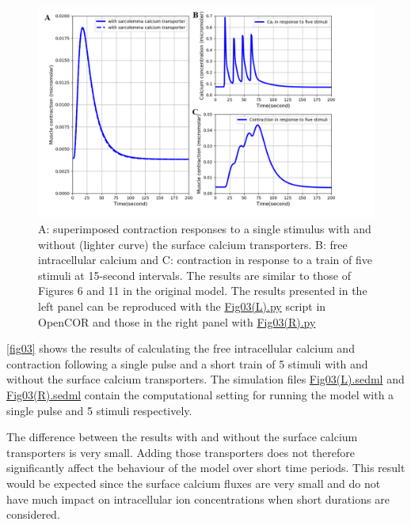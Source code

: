 \documentclass[fleqn,10pt]{physiome}
\begin{document}
\begin{figure}[ht]
\centering
\includegraphics[width=1\linewidth]{fig03.png}
\caption{A: superimposed contraction responses to a single stimulus with and without (lighter curve) the surface calcium transporters. B: free intracellular calcium and C: contraction in response to a train of five stimuli at 15-second intervals. The results are similar to those of Figures 6 and 11 in the original \citet{shorten2007mathematical} model. The results presented in the left panel can be reproduced with the \href{https://models.physiomeproject.org/workspace/5c6/file/afd4d5cb20ecdcbc0b10198fe31795520488a34e/Fig03(L).py}{Fig03(L).py} script in OpenCOR and those in the right panel with \href{https://models.physiomeproject.org/workspace/5c6/file/afd4d5cb20ecdcbc0b10198fe31795520488a34e/Fig03(R).py}{Fig03(R).py}}
\label{fig03}
\end{figure}


\autoref{fig03} shows the results of calculating the free intracellular calcium and contraction following a single pulse and a short train of 5 stimuli with and without the surface calcium transporters. The simulation files \href{https://models.physiomeproject.org/workspace/5c6/file/afd4d5cb20ecdcbc0b10198fe31795520488a34e/Fig03(L).sedml}{Fig03(L).sedml} and \href{https://models.physiomeproject.org/workspace/5c6/file/afd4d5cb20ecdcbc0b10198fe31795520488a34e/Fig03(R).sedml}{Fig03(R).sedml} contain the computational setting for running the model with a single pulse and 5 stimuli respectively.

The difference between the results with and without the surface calcium transporters is very small. Adding those transporters does not therefore significantly affect the behaviour of the model over short time periods. This result would be expected since the surface calcium fluxes are very small and do not have much impact on intracellular ion concentrations when short durations are considered.
\end{document}
